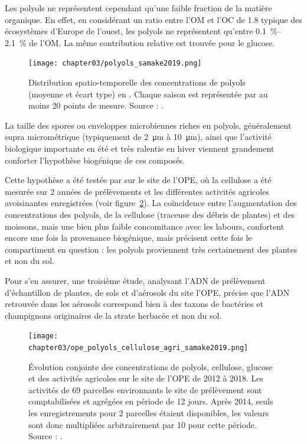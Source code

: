 Les polyols ne représentent cependant qu'une faible fraction de la matière organique. En
effet, en considérant un ratio entre l'OM et l'OC de 1.8 typique des écosystèmes d'Europe
de l'ouest, les polyols ne représentent qu'entre \SIrange{0.1}{2.1}{\percent} de l'OM. La
même contribution relative est trouvée pour le glucose.

\begin{figure}[ht]
    \centering
    \texttt{[image: chapter03/polyols\_samake2019.png]}
    \caption{
        Distribution spatio-temporelle des concentrations de polyols (moyenne et écart
        type) en \si{\ngm}.
        Chaque saison est représentée par au moins 20 points de mesure.
        Source : \cite[figure 6]{samakePolyols2019}.
    }%
    \label{fig:polyols_samake2019}
\end{figure}

La taille des spores ou enveloppes microbiennes riches en polyols, généralement supra
micrométrique (typiquement de \SI{2}{\micro\m} à \SI{10}{\micro\m}), ainsi que l'activité
biologique importante en été et très ralentie en hiver viennent grandement conforter
l'hypothèse biogénique de ces composés.

Cette hypothèse a été testée par \cite{samakeArabitol2019} sur le site de
l'OPE, où la cellulose a été mesurée sur 2 années de prélèvements et les différentes
activités agricoles avoisinantes enregistrées (voir
figure~\ref{fig:ope_polyols_cellullose_agri}).
La coïncidence entre l'augmentation des concentrations des polyols, de la cellulose
(traceuse des débris de plantes) et des moissons, mais une bien plus faible concomitance
avec les labours, confortent encore une fois la provenance biogénique, mais précisent cette
fois le compartiment en question : les polyols proviennent très certainement des plantes
et non du sol.

Pour s'en assurer, une troisième étude, analysant l'ADN de prélèvement d'échantillon
de plantes, de sols et d'aérosols du site l'OPE, \autocite{samakeHigh2020} précise que
l'ADN retrouvée dans les aérosols correspond bien à des taxons de bactéries et champignons
originaires de la strate herbacée et non du sol.

\begin{figure}[ht]
    \centering
    \texttt{[image: chapter03/ope\_polyols\_cellulose\_agri\_samake2019.png]}
    \caption{
        Évolution conjointe des concentrations de polyols, cellulose, glucose et des
        activités agricoles sur le site de l'OPE de 2012 à 2018.
        Les activités de 69 parcelles environnants le site de prélèvement sont
        comptabilisées et agrégées en période de 12 jours.
        Après 2014, seuls les enregistrements pour 2 parcelles étaient disponibles, les
        valeurs sont donc multipliées arbitrairement par 10 pour cette période.
        Source : \cite[figure 6]{samakeArabitol2019}.
    }%
    \label{fig:ope_polyols_cellullose_agri}
\end{figure}

